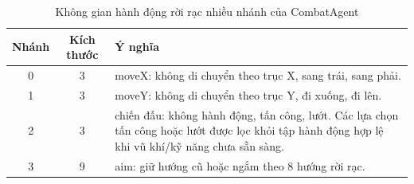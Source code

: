 \begin{table}[H]
    \centering
    \small
    \caption{Không gian hành động rời rạc nhiều nhánh của CombatAgent}
    \label{tab:action_space}
    \begin{tabular}{|c|c|p{9cm}|}
        \hline
        \textbf{Nhánh} & \textbf{Kích thước} & \textbf{Ý nghĩa} \\
        \hline
        0 & 3 & moveX: không di chuyển theo trục X, sang trái, sang phải. \\
        \hline
        1 & 3 & moveY: không di chuyển theo trục Y, đi xuống, đi lên. \\
        \hline
        2 & 3 & chiến đấu: không hành động, tấn công, lướt. Các lựa chọn tấn công hoặc lướt được lọc khỏi tập hành động hợp lệ khi vũ khí/kỹ năng chưa sẵn sàng. \\
        \hline
        3 & 9 & aim: giữ hướng cũ hoặc ngắm theo 8 hướng rời rạc. \\
        \hline
    \end{tabular}
\end{table}

